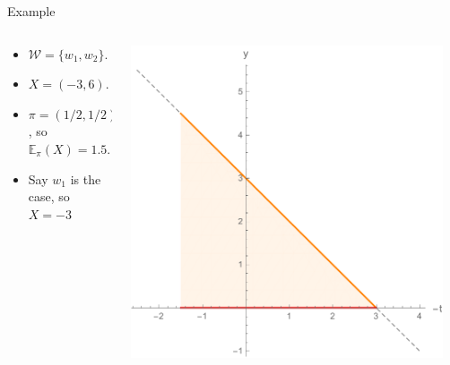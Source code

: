 \documentclass[aspectratio=169, dvipsnames]{beamer}
\newcommand{\E}{\mathbb{E}}
\newcommand{\W}{\mathcal{W}}
\begin{document}
\begin{frame}{Example}
  \begin{columns}
    \begin{column}{.4\linewidth}
      \begin{itemize}
      \item $\W = \{w_1, w_2\}$.
      \item $X = (-3, 6)$.
      \item $\pi = (1/2, 1/2)$, so $\E_{\pi}(X)=1.5$.
      \item Say $w_1$ is the case, so $X = -3$
      \end{itemize}
    \end{column}
    \begin{column}{.58\linewidth}
      \begin{center}
        \includegraphics[width=0.95\textwidth]{GSP1.pdf}
      \end{center}
    \end{column}
  \end{columns}
\end{frame}
\end{document}
